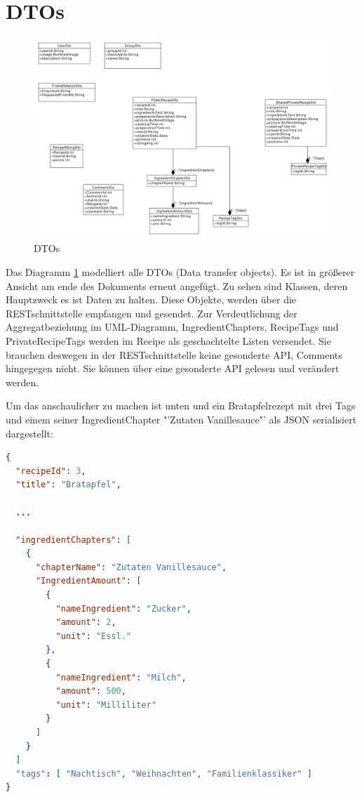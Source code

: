 \section{DTOs} \label{kapdtos}
\begin{figure}[H]
	\centering
	\includegraphics[width=1.0\textwidth]{generatedpics/DTO.pdf}%
	\caption{DTOs}%
	\label{dtos}
\end{figure}
Das Diagramm \ref{dtos} modelliert alle DTOs (Data transfer objects). Es ist in größerer Ansicht am ende des Dokuments erneut angefügt. Zu sehen sind Klassen, deren Hauptzweck es ist Daten zu halten. Diese Objekte, werden über die RESTschnittstelle empfangen und gesendet. 
Zur Verdeutlichung der Aggregatbeziehung im UML-Diagramm, IngredientChapters, RecipeTags und PrivateRecipeTags werden im Recipe als geschachtelte Listen versendet. Sie brauchen deswegen in der RESTschnittstelle keine gesonderte API, Comments hingegegen nicht. Sie können über eine gesonderte API gelesen und verändert werden. 

Um das anschaulicher zu machen ist unten und ein Bratapfelrezept mit drei Tags und einem seiner IngredientChapter "'Zutaten Vanillesauce"' als JSON serialisiert dargestellt:


\begin{lstlisting}[language=json]
{
  "recipeId": 3,
  "title": "Bratapfel",
  
  ...
  
  "ingredientChapters": [
    {
      "chapterName": "Zutaten Vanillesauce",
      "IngredientAmount": [
        {
          "nameIngredient": "Zucker",
          "amount": 2,
          "unit": "Essl."
        },
        {
          "nameIngredient": "Milch",
          "amount": 500,
          "unit": "Milliliter"
        }
      ]
    }
  ]
  "tags": [ "Nachtisch", "Weihnachten", "Familienklassiker" ]
}

\end{lstlisting}
